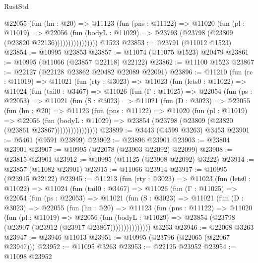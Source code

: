 \begin{lexlean}{RustStd}
\begin{coremodule}
                    @22055
                      (fun (hn : @20) =>
                      @11123
                        (fun (pns : @11122) =>
                        @11020
                          (fun (pl : @11019) =>
                          @22056
                            (fun (bodyL : @11029) =>
                            @23793 (@23798 (@23809 (@23820 @22136))))))))))))))))
    @1523
@23853 := @23791 (@11012 @1523)
@23854 := @10995 @23853
@23857 := @11074 (@11075 @1523) @20479
@23861 := @10995 (@11066 (@23857 @22118) @22122)
@23862 := @11100 @1523
@23867 := @22127 (@22128 @23862 @20482 @22089 @22091)
@23896 := @11210
    (fun (rc : @11019) =>
    @11021
      (fun (rty : @3023) =>
      @11023
        (fun (lets0 : @11022) =>
        @11024
          (fun (tail0 : @3467) =>
          @11026
            (fun (Γ : @11025) =>
            @22054
              (fun (ps : @22053) =>
              @11021
                (fun (S : @3023) =>
                @11021
                  (fun (D : @3023) =>
                  @22055
                    (fun (hn : @20) =>
                    @11123
                      (fun (pns : @11122) =>
                      @11020
                        (fun (pl : @11019) =>
                        @22056
                          (fun (bodyL : @11029) =>
                          @23854 (@23798 (@23809 (@23820 (@23861 @23867))))))))))))))))
@23899 := @3443 (@4599 @3263) @3453
@23901 := @5461 (@9591 @23899)
@23902 := @23896 @23901
@23903 := @23804 @23901
@23907 := @10995 (@22078 (@23903 @22092) @22099)
@23908 := @23815 @23901
@23912 := @10995 (@11125 (@23908 @22092) @3222)
@23914 := @23857 (@11082 @23901)
@23915 := @11066 @23914
@23917 := @10995 (@23915 @22122)
@23945 := @11213
    (fun (rty : @3023) =>
    @11023
      (fun (lets0 : @11022) =>
      @11024
        (fun (tail0 : @3467) =>
        @11026
          (fun (Γ : @11025) =>
          @22054
            (fun (ps : @22053) =>
            @11021
              (fun (S : @3023) =>
              @11021
                (fun (D : @3023) =>
                @22055
                  (fun (hn : @20) =>
                  @11123
                    (fun (pns : @11122) =>
                    @11020
                      (fun (pl : @11019) =>
                      @22056
                        (fun (bodyL : @11029) =>
                        @23854 (@23798 (@23907 (@23912 (@23917 @23867)))))))))))))))
    @3263
@23946 := @22068 @3263
@23947 := @23946 @11013
@23951 := @10995 (@23796 (@22065 (@22067 @23947)))
@23952 := @11095 @3263
@23953 := @22125 @23952
@23954 := @11098 @23952

\end{coremodule}
\end{lexlean}
